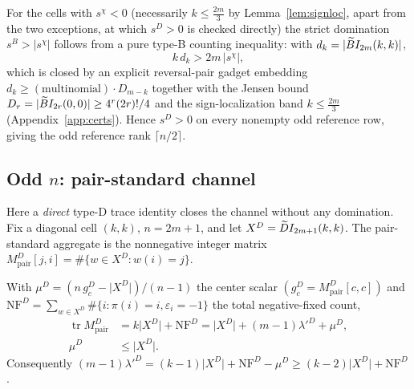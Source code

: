 For the cells with $s^{\chi}<0$ (necessarily $k\le\tfrac{2m}{3}$ by Lemma~\ref{lem:signloc}, apart from the two
exceptions, at which $s^{D}>0$ is checked directly) the strict domination $s^{B}>\lvert s^{\chi}\rvert$ follows from a
pure type-B counting inequality: with $d_k=\lvert\widetilde{B}I_{2m}(k,k)\rvert$,
\[
  k\,d_k>2m\,\lvert s^{\chi}\rvert,
\]
which is closed by an explicit reversal-pair gadget embedding $d_k\ge (\text{multinomial})\cdot D_{m-k}$ together with
the Jensen bound $D_r=\lvert\widetilde{B}I_{2r}(0,0)\rvert\ge 4^r(2r)!/4$ and the sign-localization band
$k\le\tfrac{2m}{3}$ (Appendix~\ref{app:certs}).  Hence $s^{D}>0$ on every nonempty odd reference row, giving the odd
reference rank $\lceil n/2\rceil$.

\subsection{Odd \texorpdfstring{$n$}{n}: pair-standard channel}

Here a \emph{direct} type-D trace identity closes the channel without any domination.  Fix a diagonal cell $(k,k)$,
$n=2m+1$, and let $X^{D}=\widetilde{D}I_{2m+1}(k,k)$.  The pair-standard aggregate is the nonnegative integer matrix
$M^{D}_{\mathrm{pair}}[j,i]=\#\{w\in X^{D}:w(i)=j\}$.

\begin{lemma}\label{lem:typedtrace}
With $\mu^{D}=(n\,g^{D}_c-\lvert X^{D}\rvert)/(n-1)$ the center scalar $(g^{D}_c=M^{D}_{\mathrm{pair}}[c,c])$ and
$\mathrm{NF}^{D}=\sum_{w\in X^{D}}\#\{i:\pi(i)=i,\varepsilon_i=-1\}$ the total negative-fixed count,
\begin{align}
  \operatorname{tr}M^{D}_{\mathrm{pair}}&=k\lvert X^{D}\rvert+\mathrm{NF}^{D}
     =\lvert X^{D}\rvert+(m-1)\lambda'^{D}+\mu^{D},\label{eq:typed-trace}\\
  \mu^{D}&\le\lvert X^{D}\rvert.\label{eq:mu-bound}
\end{align}
Consequently $(m-1)\lambda'^{D}=(k-1)\lvert X^{D}\rvert+\mathrm{NF}^{D}-\mu^{D}\ge(k-2)\lvert X^{D}\rvert+\mathrm{NF}^{D}$.
\end{lemma}

